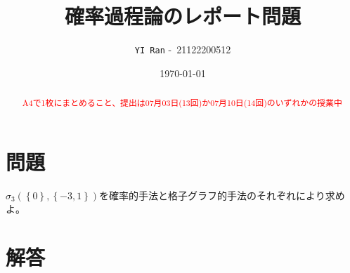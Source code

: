 \documentclass[dvipdfmx]{jsarticle} %
\title{\vspace{-4cm}確率過程論のレポート問題}
\author{\texttt{YI\ Ran} -\ 21122200512}
\date{\today}
\begin{document}
\maketitle


\begin{abstract}
  \textcolor{red}{A4で1枚にまとめること、提出は07月03日(13回)か07月10日(14回)のいずれかの授業中}  
\end{abstract}
\section*{問題}
$ \sigma_3 \left(\left\{0\right\}, \left\{-3,1\right\}\right) $を確率的手法と格子グラフ的手法のそれぞれにより求めよ。
\vspace{-0.4cm}
\section*{解答}
\end{document}
